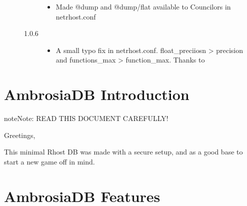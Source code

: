 \documentclass[letterpaper,10pt,english]{sphinxmanual}
\begin{document}
\begin{description}
\begin{description}
\begin{itemize}
\item {} 
\sphinxAtStartPar
Made @dump and @dump/flat available to Councilors in netrhost.conf

\end{itemize}

\item[{1.0.6}] \leavevmode\begin{itemize}
\item {} 
\sphinxAtStartPar
A small typo fix in netrhost.conf. float\_preciiosn \sphinxhyphen{}\textgreater{} precision and
functions\_max \sphinxhyphen{}\textgreater{} function\_max. Thanks to 

\end{itemize}

\end{description}

\end{description}


\section{AmbrosiaDB Introduction}
\label{\detokenize{ambrosiadb:ambrosiadb-introduction}}
\begin{sphinxadmonition}{note}{Note:}
\sphinxAtStartPar
READ THIS DOCUMENT CAREFULLY!
\end{sphinxadmonition}

\sphinxAtStartPar
Greetings,

\sphinxAtStartPar
This minimal Rhost DB was made with a secure setup, and as a good base to start
a new game off in mind.


\section{AmbrosiaDB Features}
\label{\detokenize{ambrosiadb:ambrosiadb-features}}
\end{document}
